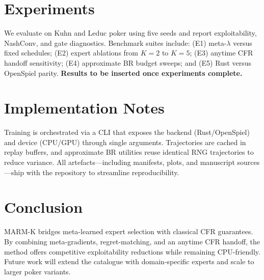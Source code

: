 \documentclass{icml2024}
\begin{document}
\section{Experiments}
We evaluate on Kuhn and Leduc poker using five seeds and report exploitability, NashConv, and gate diagnostics. Benchmark suites include: (E1) meta-$\lambda$ versus fixed schedules; (E2) expert ablations from $K=2$ to $K=5$; (E3) anytime CFR handoff sensitivity; (E4) approximate BR budget sweeps; and (E5) Rust versus OpenSpiel parity. \textbf{Results to be inserted once experiments complete.}

\section{Implementation Notes}
Training is orchestrated via a CLI that exposes the backend (Rust/OpenSpiel) and device (CPU/GPU) through single arguments. Trajectories are cached in replay buffers, and approximate BR utilities reuse identical RNG trajectories to reduce variance. All artefacts—including manifests, plots, and manuscript sources—ship with the repository to streamline reproducibility.

\section{Conclusion}
MARM-K bridges meta-learned expert selection with classical CFR guarantees. By combining meta-gradients, regret-matching, and an anytime CFR handoff, the method offers competitive exploitability reductions while remaining CPU-friendly. Future work will extend the catalogue with domain-specific experts and scale to larger poker variants.
\end{document}
